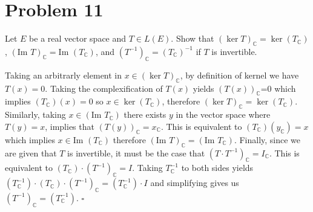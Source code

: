 \documentclass[11pt]{article}
\newcommand{\C}{\mathbb{C}}
\newenvironment{proof}{\noindent{\bf Proof.}}{\hfill $\square$\medskip}
\begin{document}
\section{Problem 11}
Let $E$ be a real vector space and $T\in L(E)$. Show that $(\ker T)_{\C} =\ker(T_{\C})$,
$(\text{Im } T)_{\C}=\text{Im }(T_{\C})$, and $(T^{-1})_{\C}=(T_{\C})^{-1}$ if $T$ is invertible.

\begin{proof}
Taking an arbitrarly element in $x\in(\ker T)_{\C}$, by definition of kernel we have $T(x)=0$. Taking the complexification
of $T(x)$ yields $(T(x))_{\C}$=0 which implies $(T_{\C})(x)=0$ so $x\in\ker(T_{\C})$, therefore $(\ker T)_{\C} =\ker(T_{\C})$.
Similarly, taking $x\in(\text{Im }T_{\C})$ there exists $y$ in the vector space where $T(y)=x$, implies that $(T(y))_{\C}=x_{\C}$.
This is equivalent to $(T_{\C})(y_{\C})=x$ which implies $x\in\text{Im }(T_{\C})$ therefore $(\text{Im }T)_{\C}=(\text{Im }T_{\C})$.
Finally, since we are given that $T$ is invertible, it must be the case that $(T\cdot T^{-1})_{\C}=I_{\C}$. This is equivalent
to $(T_{\C})\cdot(T^{-1})_{\C}=I$. Taking $T^{-1}_{\C}$ to both sides yields 
$(T^{-1}_{\C})\cdot(T_{\C})\cdot(T^{-1})_{\C}=(T^{-1}_{\C})\cdot I$ and simplifying gives us $(T^{-1})_{\C}=(T^{-1}_{\C})$.
\end{proof}
\end{document}
